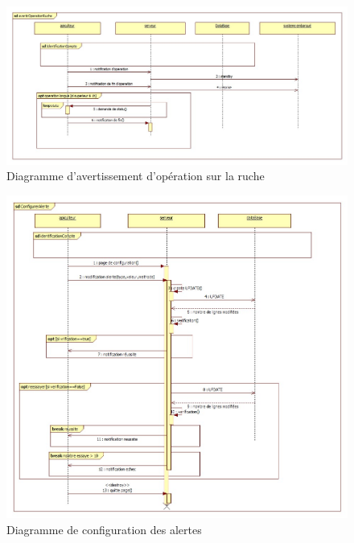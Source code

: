 \begin{figure}[h!]
\centering\includegraphics[scale=0.4]{avertirOperationRuche.jpg}
\caption{\label{fig:seq3} Diagramme d'avertissement d'opération sur la ruche}
\end{figure}
\begin{figure}[h!]
\centering\includegraphics[scale=0.4]{configurerAlerte.jpg}
\caption{\label{fig:seq4} Diagramme de configuration des alertes}
\end{figure}
